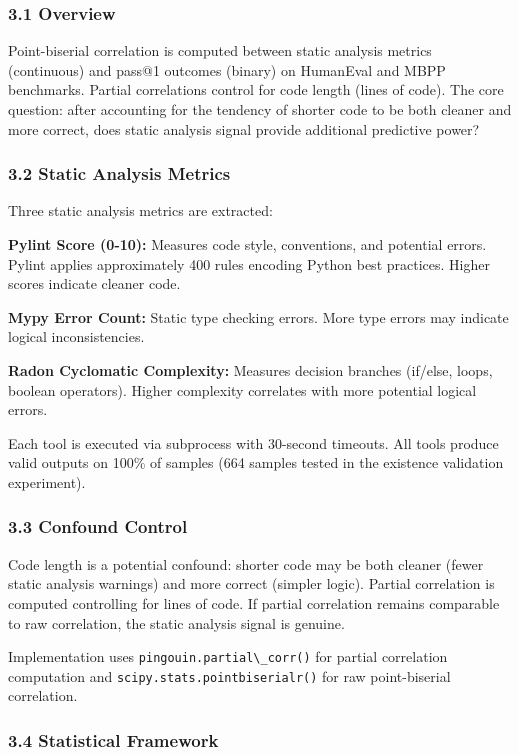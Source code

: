 
\subsubsection{3.1 Overview}

Point-biserial correlation is computed between static analysis metrics (continuous) and pass@1 outcomes (binary) on HumanEval and MBPP benchmarks. Partial correlations control for code length (lines of code). The core question: after accounting for the tendency of shorter code to be both cleaner and more correct, does static analysis signal provide additional predictive power?

\subsubsection{3.2 Static Analysis Metrics}

Three static analysis metrics are extracted:

\textbf{Pylint Score (0-10):} Measures code style, conventions, and potential errors. Pylint applies approximately 400 rules encoding Python best practices. Higher scores indicate cleaner code.

\textbf{Mypy Error Count:} Static type checking errors. More type errors may indicate logical inconsistencies.

\textbf{Radon Cyclomatic Complexity:} Measures decision branches (if/else, loops, boolean operators). Higher complexity correlates with more potential logical errors.

Each tool is executed via subprocess with 30-second timeouts. All tools produce valid outputs on 100\% of samples (664 samples tested in the existence validation experiment).

\subsubsection{3.3 Confound Control}

Code length is a potential confound: shorter code may be both cleaner (fewer static analysis warnings) and more correct (simpler logic). Partial correlation is computed controlling for lines of code. If partial correlation remains comparable to raw correlation, the static analysis signal is genuine.

Implementation uses \texttt{pingouin.partial\textbackslash \_corr()} for partial correlation computation and \texttt{scipy.stats.pointbiserialr()} for raw point-biserial correlation.

\subsubsection{3.4 Statistical Framework}

